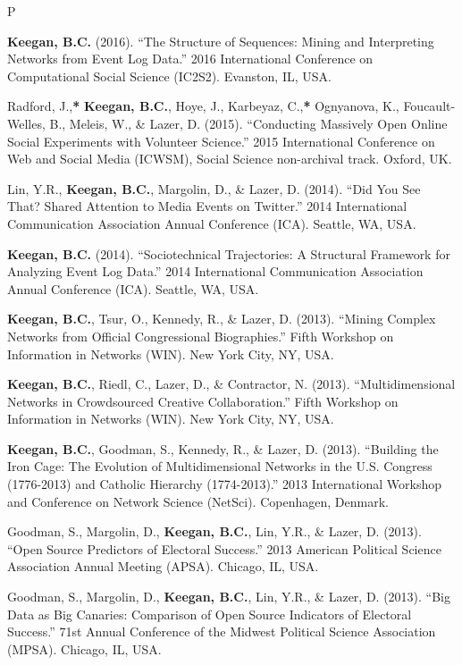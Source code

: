 \documentclass{cv}
\begin{document}
\begin{entries}{P}
		\item \textbf{Keegan, B.C.} (2016). ``The Structure of Sequences: Mining and Interpreting Networks from Event Log Data.'' 2016 International Conference on Computational Social Science (IC2S2). Evanston, IL, USA.
		\item Radford, J.,\textbf{*} \textbf{Keegan, B.C.}, Hoye, J., Karbeyaz, C.,\textbf{*} Ognyanova, K., Foucault-Welles, B., Meleis, W., \& Lazer, D. (2015). ``Conducting Massively Open Online Social Experiments with Volunteer Science.'' 2015 International Conference on Web and Social Media (ICWSM), Social Science non-archival track. Oxford, UK.
		\item Lin, Y.R., \textbf{Keegan, B.C.}, Margolin, D., \& Lazer, D. (2014). ``Did You See That? Shared Attention to Media Events on Twitter.'' 2014 International Communication Association Annual Conference (ICA). Seattle, WA, USA.
		\item \textbf{Keegan, B.C.} (2014). ``Sociotechnical Trajectories: A Structural Framework for Analyzing Event Log Data.'' 2014 International Communication Association Annual Conference (ICA). Seattle, WA, USA.
		\item \textbf{Keegan, B.C.}, Tsur, O., Kennedy, R., \& Lazer, D. (2013). ``Mining Complex Networks from Official Congressional Biographies.'' Fifth Workshop on Information in Networks (WIN). New York City, NY, USA.
		\item \textbf{Keegan, B.C.}, Riedl, C., Lazer, D., \& Contractor, N. (2013). ``Multidimensional Networks in Crowdsourced Creative Collaboration.'' Fifth Workshop on Information in Networks (WIN). New York City, NY, USA.
		\item \textbf{Keegan, B.C.}, Goodman, S., Kennedy, R., \& Lazer, D. (2013). ``Building the Iron Cage: The Evolution of Multidimensional Networks in the U.S. Congress (1776-2013) and Catholic Hierarchy (1774-2013).'' 2013 International Workshop and Conference on Network Science (NetSci). Copenhagen, Denmark.
		\item Goodman, S., Margolin, D., \textbf{Keegan, B.C.}, Lin, Y.R., \& Lazer, D. (2013). ``Open Source Predictors of Electoral Success.'' 2013 American Political Science Association Annual Meeting (APSA). Chicago, IL, USA.
		\item Goodman, S., Margolin, D., \textbf{Keegan, B.C.}, Lin, Y.R., \& Lazer, D. (2013). ``Big Data as Big Canaries: Comparison of Open Source Indicators of Electoral Success.'' 71st Annual Conference of the Midwest Political Science Association (MPSA). Chicago, IL, USA.

\end{entries}
\end{document}
